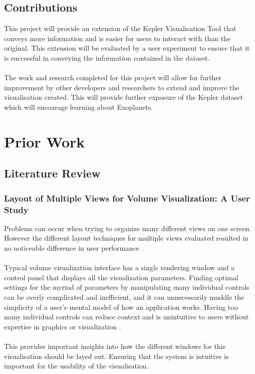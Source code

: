 \documentclass[11pt
              , a4paper
              , twoside
              , openright
              ]{report}
\begin{document}
\section{Contributions}
This project will provide an extension of the Kepler Visualisation Tool
\cite{kepler_github} that conveys more information and is easier for users to
interact with than the original. This extension will be evaluated by a user
experiment to ensure that it is successful in conveying the information
contained in the dataset.
\\\\
The work and research completed for this project will allow for further
improvement by other developers and researchers to extend and improve the
visualisation created. This will provide further exposure of the Kepler dataset
which will encourage learning about Exoplanets.
\chapter{Prior Work}
\section{Literature Review}
\subsection{Layout of Multiple Views for Volume Visualization: A User Study}
Problems can occur when trying to organize many different views on one screen.
However the different layout techniques
for multiple views evaluated resulted in no noticeable difference in user
performance  \cite{lewis}.
\\\\
Typical volume visualization interface has a single rendering window and a
control panel that displays all the visualization parameters. Finding optimal
settings
for the myriad of parameters by manipulating many individual controls can be
overly
complicated and inefficient, and it can unnecessarily muddle the simplicity of a
user’s
mental model of how an application works. Having too many individual controls
can reduce context and is unintuitive to users without expertise in graphics or
visualization \cite{lewis}. 
\\\\
This provides important insights into how the different windows for this
visualisation should be layed out. Ensuring that the system is intuitive is
important for the usability of the visualisation.
\end{document}
